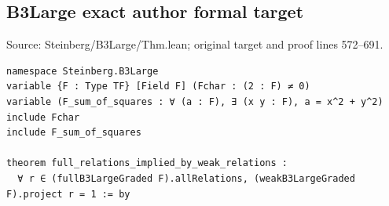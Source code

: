 \subsection*{B3Large exact author formal target}
\noindent Source: Steinberg/B3Large/Thm.lean; original target and proof lines 572--691.
\begin{Verbatim}
namespace Steinberg.B3Large
variable {F : Type TF} [Field F] (Fchar : (2 : F) ≠ 0)
variable (F_sum_of_squares : ∀ (a : F), ∃ (x y : F), a = x^2 + y^2)
include Fchar
include F_sum_of_squares

theorem full_relations_implied_by_weak_relations :
  ∀ r ∈ (fullB3LargeGraded F).allRelations, (weakB3LargeGraded F).project r = 1 := by
\end{Verbatim}
